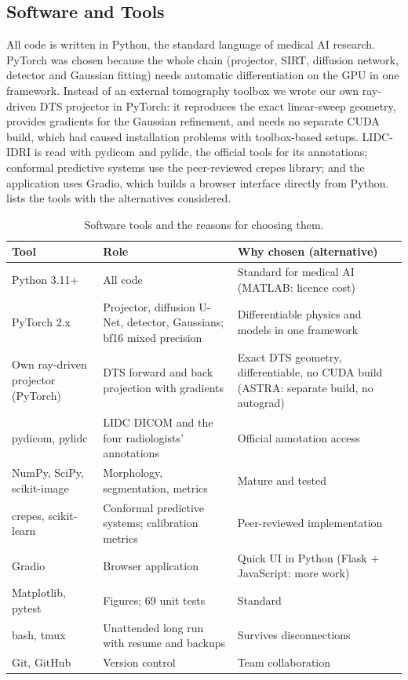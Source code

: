 \subsection{Software and Tools}

All code is written in Python, the standard language of medical AI research. PyTorch was chosen because the whole chain (projector, SIRT, diffusion network, detector and Gaussian fitting) needs automatic differentiation on the GPU in one framework. Instead of an external tomography toolbox we wrote our own ray-driven DTS projector in PyTorch: it reproduces the exact linear-sweep geometry, provides gradients for the Gaussian refinement, and needs no separate CUDA build, which had caused installation problems with toolbox-based setups. LIDC-IDRI is read with pydicom and pylidc, the official tools for its annotations; conformal predictive systems use the peer-reviewed crepes library; and the application uses Gradio, which builds a browser interface directly from Python.   lists the tools with the alternatives considered.

\begin{table}[!htbp]
\centering\small
\caption{Software tools and the reasons for choosing them.}
\label{tab:tools}
\begin{tabularx}{\linewidth}{>{\raggedright\arraybackslash}p{3.3cm} >{\raggedright\arraybackslash}X >{\raggedright\arraybackslash}X}
\toprule
Tool & Role & Why chosen (alternative) \\
\midrule
Python 3.11+ & All code & Standard for medical AI (MATLAB: licence cost) \\
PyTorch 2.x & Projector, diffusion U-Net, detector, Gaussians; bf16 mixed precision & Differentiable physics and models in one framework \\
Own ray-driven projector (PyTorch) & DTS forward and back projection with gradients & Exact DTS geometry, differentiable, no CUDA build (ASTRA: separate build, no autograd) \\
pydicom, pylidc & LIDC DICOM and the four radiologists' annotations & Official annotation access \\
NumPy, SciPy, scikit-image & Morphology, segmentation, metrics & Mature and tested \\
crepes, scikit-learn & Conformal predictive systems; calibration metrics & Peer-reviewed implementation~\cite{bostrom2022crepes} \\
Gradio & Browser application & Quick UI in Python (Flask + JavaScript: more work) \\
Matplotlib, pytest & Figures; 69 unit tests & Standard \\
bash, tmux & Unattended long run with resume and backups & Survives disconnections \\
Git, GitHub & Version control & Team collaboration \\
\bottomrule
\end{tabularx}
\end{table}


